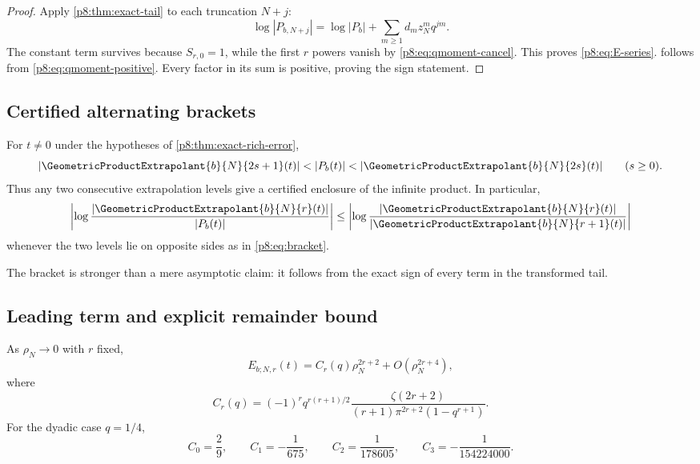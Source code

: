 \documentclass[11pt]{article}
\numberwithin{equation}{section}
\theoremstyle{definition}
\theoremstyle{remark}
\begin{document}
\begin{proof}
Apply \cref{p8:thm:exact-tail} to each truncation $N+j$:
\[
\log|P_{b,N+j}|=\log|P_b|+
\sum_{m\ge1}d_m z_N^m q^{jm}.
\]
The constant term survives because $S_{r,0}=1$, while the first $r$ powers vanish by \cref{p8:eq:qmoment-cancel}. This proves \cref{p8:eq:E-series}.  follows from \cref{p8:eq:qmoment-positive}. Every factor in its sum is positive, proving the sign statement.
\end{proof}

\subsection{Certified alternating brackets}

\begin{corollary}
\label{p8:cor:brackets}
For $t\ne0$ under the hypotheses of \cref{p8:thm:exact-rich-error},
\begin{equation}
|\GeometricProductExtrapolant{b}{N}{2s+1}(t)|<|P_b(t)|<
|\GeometricProductExtrapolant{b}{N}{2s}(t)|
\qquad(s\ge0).
\label{p8:eq:bracket}
\end{equation}
Thus any two consecutive extrapolation levels give a certified enclosure of the infinite product. In particular,
\begin{equation}
\left|\log\frac{|\GeometricProductExtrapolant{b}{N}{r}(t)|}{|P_b(t)|}\right|
\le
\left|\log\frac{|\GeometricProductExtrapolant{b}{N}{r}(t)|}
{|\GeometricProductExtrapolant{b}{N}{r+1}(t)|}\right|
\label{p8:eq:aposteriori-log}
\end{equation}
whenever the two levels lie on opposite sides as in \cref{p8:eq:bracket}.
\end{corollary}

The bracket is stronger than a mere asymptotic claim: it follows from the exact sign of every term in the transformed tail.

\subsection{Leading term and explicit remainder bound}

\begin{corollary}
\label{p8:cor:leading-error}
As $\rho_N\to0$ with $r$ fixed,
\begin{equation}
E_{b;N,r}(t)
=C_r(q)\rho_N^{2r+2}+O(\rho_N^{2r+4}),
\label{p8:eq:leading-error}
\end{equation}
where
\begin{equation}
C_r(q)=(-1)^r q^{r(r+1)/2}
\frac{\zeta(2r+2)}{(r+1)\pi^{2r+2}(1-q^{r+1})}.
\label{p8:eq:Cr}
\end{equation}
For the dyadic case $q=1/4$,
\begin{equation}
C_0=\frac29,\qquad
C_1=-\frac1{675},\qquad
C_2=\frac1{178605},\qquad
C_3=-\frac1{154224000}.
\label{p8:eq:Cr-dyadic}
\end{equation}
\end{corollary}
\end{document}
